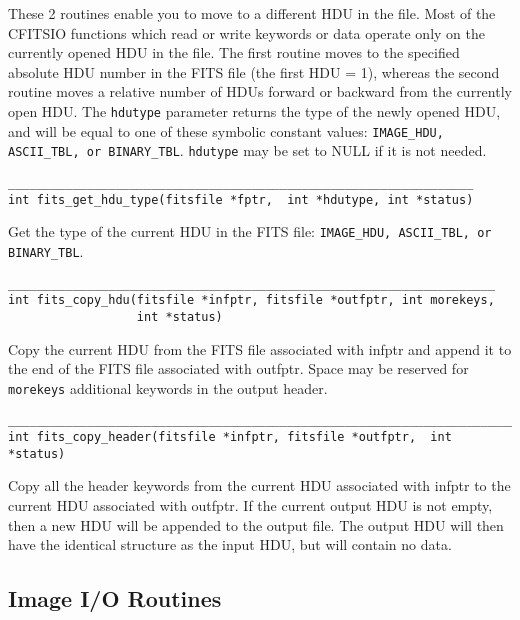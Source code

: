 \documentclass[11pt]{article}
\begin{document}
These 2 routines enable you to move to a different HDU in the file.
Most of the CFITSIO functions which read or write keywords or data
operate only on the currently opened HDU in the file.  The first
routine moves to the specified absolute HDU number in the FITS
file (the first HDU = 1), whereas the second routine moves a relative
number of HDUs forward or backward from the currently open HDU.  The
{\tt hdutype} parameter returns the type of the newly opened HDU, and will
be equal to one of these symbolic constant values: {\tt IMAGE\_HDU,
ASCII\_TBL, or BINARY\_TBL}.  {\tt hdutype} may be set to NULL
if it is not needed.

\begin{verbatim}
_________________________________________________________________
int fits_get_hdu_type(fitsfile *fptr,  int *hdutype, int *status)
\end{verbatim}

Get the type of the current HDU in the FITS file:  {\tt IMAGE\_HDU,
ASCII\_TBL, or BINARY\_TBL}.

\begin{verbatim}
____________________________________________________________________
int fits_copy_hdu(fitsfile *infptr, fitsfile *outfptr, int morekeys,
                  int *status)
\end{verbatim}

Copy the current HDU from the FITS file associated with infptr and
append it to the end of the FITS file associated with outfptr.  Space
may be reserved for {\tt morekeys} additional keywords in the output
header.

\begin{verbatim}
_______________________________________________________________________
int fits_copy_header(fitsfile *infptr, fitsfile *outfptr,  int *status)
\end{verbatim}

Copy all the header keywords from the current HDU associated with
infptr to the current HDU associated with outfptr.  If the current
output HDU is not empty, then a new HDU will be appended to the output
file. The output HDU will then have the identical structure as the
input HDU, but will contain no data.

\newpage
\subsection{Image I/O Routines}
\end{document}
